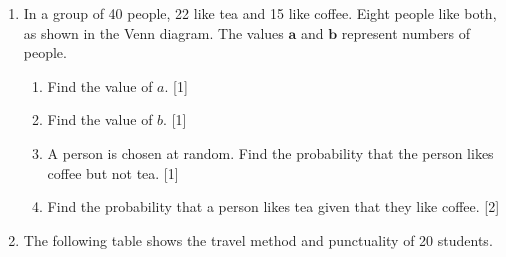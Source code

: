 \documentclass[12pt, twoside]{article}
\begin{document}
\begin{enumerate}[itemsep=0.15cm]
\begin{enumerate}[itemsep=0.1cm]
  \item Write down $\mathrm{P}(C \cap D)$. \hfill [1]
  \item Find $\mathrm{P}(C \cup D)$. \hfill [2]
\end{enumerate}


\newpage
\item In a group of 40 people, 22 like tea and 15 like coffee.
Eight people like both, as shown in the Venn diagram.
The values $\boldsymbol{a}$ and $\boldsymbol{b}$ represent numbers of people.

\begin{center}
\vspace{-0.2cm}
\vspace{-0.2cm}
\end{center}

\begin{enumerate}[itemsep=0.0cm]
  \item Find the value of $a$. \hfill [1]
  \item Find the value of $b$. \hfill [1]
  \item A person is chosen at random. Find the probability that the person
        likes coffee but not tea. \hfill [1]
  \item Find the probability that a person likes tea given that they like coffee. \hfill [2]
\end{enumerate}


\item The following table shows the travel method and punctuality of 20 students.


\end{enumerate}
\end{document}
